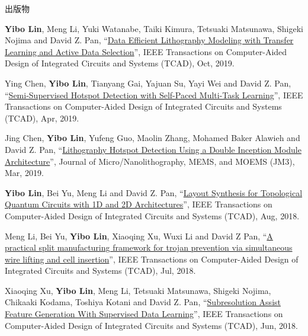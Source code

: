 \begin{rSection}{出版物}
\begin{description}[font=\normalfont]
{}
            

\item[{[J15]}]{
        \textbf{Yibo Lin}, Meng Li, Yuki Watanabe, Taiki Kimura, Tetsuaki Matsunawa, Shigeki Nojima and David Z. Pan, 
    ``\href{https://doi.org/10.1109/TCAD.2018.2864251}{Data Efficient Lithography Modeling with Transfer Learning and Active Data Selection}'', 
    IEEE Transactions on Computer-Aided Design of Integrated Circuits and Systems (TCAD), Oct, 2019.
    
}
            

\item[{[J14]}]{
        Ying Chen, \textbf{Yibo Lin}, Tianyang Gai, Yajuan Su, Yayi Wei and David Z. Pan, 
    ``\href{https://doi.org/10.1109/TCAD.2019.2912948}{Semi-Supervised Hotspot Detection with Self-Paced Multi-Task Learning}'', 
    IEEE Transactions on Computer-Aided Design of Integrated Circuits and Systems (TCAD), Apr, 2019.
    
}
            

\item[{[J13]}]{
        Jing Chen, \textbf{Yibo Lin}, Yufeng Guo, Maolin Zhang, Mohamed Baker Alawieh and David Z. Pan, 
    ``\href{https://doi.org/10.1117/1.JMM.18.1.013507}{Lithography Hotspot Detection Using a Double Inception Module Architecture}'', 
    Journal of Micro/Nanolithography, MEMS, and MOEMS (JM3), Mar, 2019.
    
}
            

\item[{[J12]}]{
        \textbf{Yibo Lin}, Bei Yu, Meng Li and David Z. Pan, 
    ``\href{https://doi.org/10.1109/TCAD.2017.2760511}{Layout Synthesis for Topological Quantum Circuits with 1D and 2D Architectures}'', 
    IEEE Transactions on Computer-Aided Design of Integrated Circuits and Systems (TCAD), Aug, 2018.
    
}
            

\item[{[J11]}]{
        Meng Li, Bei Yu, \textbf{Yibo Lin}, Xiaoqing Xu, Wuxi Li and David Z Pan, 
    ``\href{https://doi.org/10.1109/TCAD.2018.2859402}{A practical split manufacturing framework for trojan prevention via simultaneous wire lifting and cell insertion}'', 
    IEEE Transactions on Computer-Aided Design of Integrated Circuits and Systems (TCAD), Jul, 2018.
    
}
            

\item[{[J10]}]{
        Xiaoqing Xu, \textbf{Yibo Lin}, Meng Li, Tetsuaki Matsunawa, Shigeki Nojima, Chikaaki Kodama, Toshiya Kotani and David Z. Pan, 
    ``\href{https://doi.org/10.1109/TCAD.2017.2748029}{Subresolution Assist Feature Generation With Supervised Data Learning}'', 
    IEEE Transactions on Computer-Aided Design of Integrated Circuits and Systems (TCAD), Jun, 2018.
    
}
\end{description}
\end{rSection}
